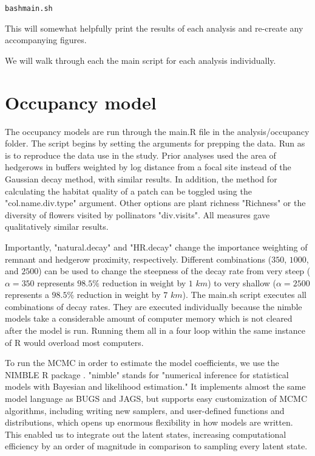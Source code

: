 \documentclass{article}\usepackage[]{graphicx}\usepackage[]{color}
\makeatletter
\newenvironment{kframe}{%
 \def\at@end@of@kframe{}%
 \ifinner\ifhmode%
  \def\at@end@of@kframe{\end{minipage}}%
  \begin{minipage}{\columnwidth}%
 \fi\fi%
 \def\FrameCommand##1{\hskip\@totalleftmargin \hskip-\fboxsep
 \colorbox{shadecolor}{##1}\hskip-\fboxsep
     \hskip-\linewidth \hskip-\@totalleftmargin \hskip\columnwidth}%
 \MakeFramed {\advance\hsize-\width
   \@totalleftmargin\z@ \linewidth\hsize
   \@setminipage}}%
 {\par\unskip\endMakeFramed%
 \at@end@of@kframe}
\newenvironment{knitrout}{}{} %
\makeatother
\begin{document}
\begin{knitrout}
\color{fgcolor}\begin{kframe}
\begin{alltt}
bash main.sh
\end{alltt}
\end{kframe}
\end{knitrout}

This will somewhat helpfully print the results of each analysis
and re-create any accompanying figures.

We will walk through each the main script for each analysis
individually.

\section{Occupancy model}

The occupancy models are run through the main.R file in the
analysis/occupancy folder. The script begins by setting the arguments
for prepping the data. Run as is to reproduce the data use in the
study. Prior analyses used the area of hedgerows in buffers weighted
by log distance from a focal site instead of the Gaussian decay
method, with similar results. In addition, the method for calculating
the habitat quality of a patch can be toggled using the
"col.name.div.type" argument. Other options are plant richness
"Richness" or the diversity of flowers visited by pollinators
"div.visits". All measures gave qualitatively similar results.

Importantly, "natural.decay" and "HR.decay" change the importance
weighting of remnant and hedgerow proximity, respectively. Different
combinations ($350$, $1000$, and $2500$) can be used to change the
steepness of the decay rate from very steep ($\alpha=350$ represents
$98.5\%$ reduction in weight by $1$ $km$) to very shallow
($\alpha=2500$ represents a $98.5\%$ reduction in weight by $7$
$km$). The main.sh script executes all combinations of decay
rates. They are executed individually because the nimble models take a
considerable amount of computer memory which is not cleared after the
model is run. Running them all in a four loop within the same instance
of R would overload most computers.

To run the MCMC in order to estimate the model coefficients, we use the
NIMBLE R package \citep{nimble-14, de2017programming}.  "nimble"
stands for "numerical inference for statistical models with Bayesian
and likelihood estimation."  It implements almost the same model
language as BUGS and JAGS, but supports easy customization of MCMC
algorithms, including writing new samplers, and user-defined functions
and distributions, which opens up enormous flexibility in how models
are written. This enabled us to integrate out the latent states,
increasing computational efficiency by an order of magnitude in
comparison to sampling every latent state. 
\end{document}
